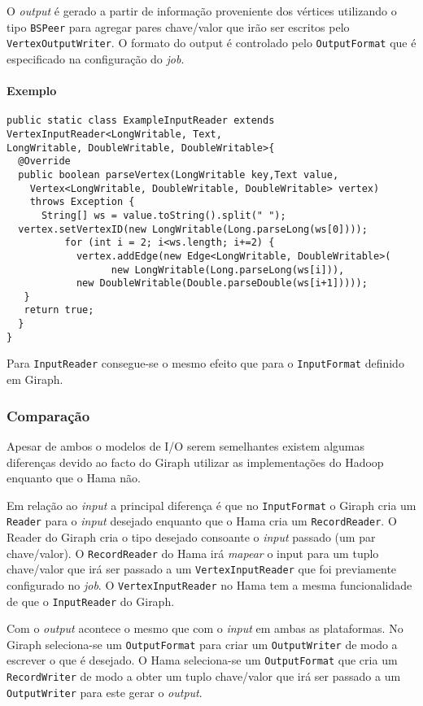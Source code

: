 O \textit{output} é gerado a partir de informação proveniente dos vértices utilizando o tipo \texttt{BSPeer} para agregar pares chave/valor que irão
ser escritos pelo \texttt{VertexOutputWriter}. O formato do output é controlado pelo \texttt{OutputFormat} que é especificado na
configuração do \textit{job}.

\paragraph{Exemplo}
\begin{verbatim}
public static class ExampleInputReader extends VertexInputReader<LongWritable, Text,
LongWritable, DoubleWritable, DoubleWritable>{
  @Override
  public boolean parseVertex(LongWritable key,Text value,
	Vertex<LongWritable, DoubleWritable, DoubleWritable> vertex)
	throws Exception {
	  String[] ws = value.toString().split(" ");
  vertex.setVertexID(new LongWritable(Long.parseLong(ws[0])));
		  for (int i = 2; i<ws.length; i+=2) {
		    vertex.addEdge(new Edge<LongWritable, DoubleWritable>(
			      new LongWritable(Long.parseLong(ws[i])),
	        new DoubleWritable(Double.parseDouble(ws[i+1]))));
   }
   return true;
  }
}
\end{verbatim}

Para \texttt{InputReader} consegue-se o mesmo efeito que para o 
\texttt{InputFormat} definido em Giraph.

\subsubsection*{Comparação}

Apesar de ambos o modelos de I/O serem semelhantes existem algumas diferenças devido ao facto do Giraph utilizar as implementações 
do Hadoop enquanto que o Hama não. 

Em relação ao \textit{input} a principal diferença é que no \texttt{InputFormat} o Giraph cria um \texttt{Reader} para o \textit{input} desejado enquanto que 
o Hama cria um \texttt{RecordReader}. O Reader do Giraph cria o tipo desejado consoante o \textit{input} passado (um par chave/valor). O \texttt{RecordReader}
do Hama irá \textit{mapear} o input para um tuplo chave/valor que irá ser passado a um \texttt{VertexInputReader} que foi previamente configurado no \textit{job}. O \texttt{VertexInputReader}
no Hama tem a mesma funcionalidade de que o \texttt{InputReader} do Giraph.

Com o \textit{output} acontece o mesmo que com o \textit{input} em ambas as plataformas. No Giraph seleciona-se um \texttt{OutputFormat} para criar um \texttt{OutputWriter} de modo
a escrever o que é desejado. O Hama seleciona-se um \texttt{OutputFormat} que cria um \texttt{RecordWriter} de modo a obter um tuplo chave/valor que irá ser
passado a um \texttt{OutputWriter} para este gerar o \textit{output}.